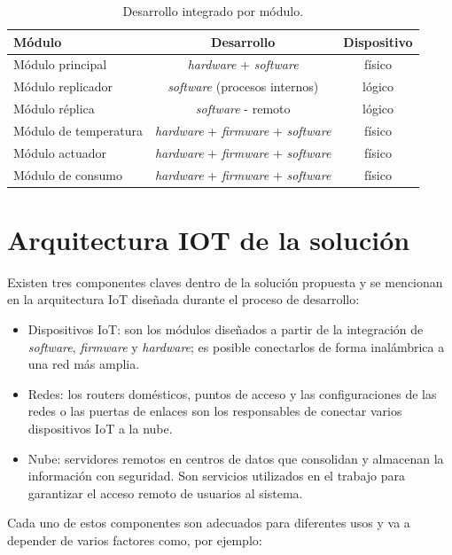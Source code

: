 \begin{table}[h]
	\centering
	\caption[Desarrollo integrado por módulo]{Desarrollo integrado por módulo.}
	\begin{tabular}{l c c }    
		\toprule
		\textbf{Módulo} 	 & \textbf{Desarrollo}  & \textbf{Dispositivo}\\
		\midrule
		Módulo principal & \emph{hardware} + \emph{software} & físico\\		
		Módulo replicador & \emph{software} (procesos internos)& lógico \\
		Módulo réplica & \emph{software} - remoto & lógico \\
		Módulo de temperatura & \emph{hardware} + \emph{firmware} + \emph{software} & físico\\		
		Módulo actuador & \emph{hardware} + \emph{firmware} + \emph{software} & físico\\		
		Módulo de consumo	 & \emph{hardware} + \emph{firmware} + \emph{software} & físico\\
		
		\bottomrule
		\hline
	\end{tabular}
	\label{tab:tablamodulos}
\end{table}


\section{Arquitectura IOT de la solución}

Existen tres componentes claves dentro de la solución propuesta y se mencionan en la arquitectura IoT diseñada durante el proceso de desarrollo: 


\begin{itemize}
\item Dispositivos IoT: son los módulos diseñados a partir de la integración de \emph{software}, \emph{firmware} y \emph{hardware}; es posible conectarlos de forma inalámbrica a una red más amplia.
\item Redes: los routers domésticos, puntos de acceso y las configuraciones de las redes o las puertas de enlaces son los responsables de conectar varios dispositivos IoT a la nube.
\item Nube: servidores remotos en centros de datos que consolidan y almacenan la información con seguridad. Son servicios utilizados en el trabajo para garantizar el acceso remoto de usuarios al sistema.
\end{itemize}
\vspace{0.5cm}
Cada uno de estos componentes son adecuados para diferentes usos y va a depender de varios factores como, por ejemplo:

